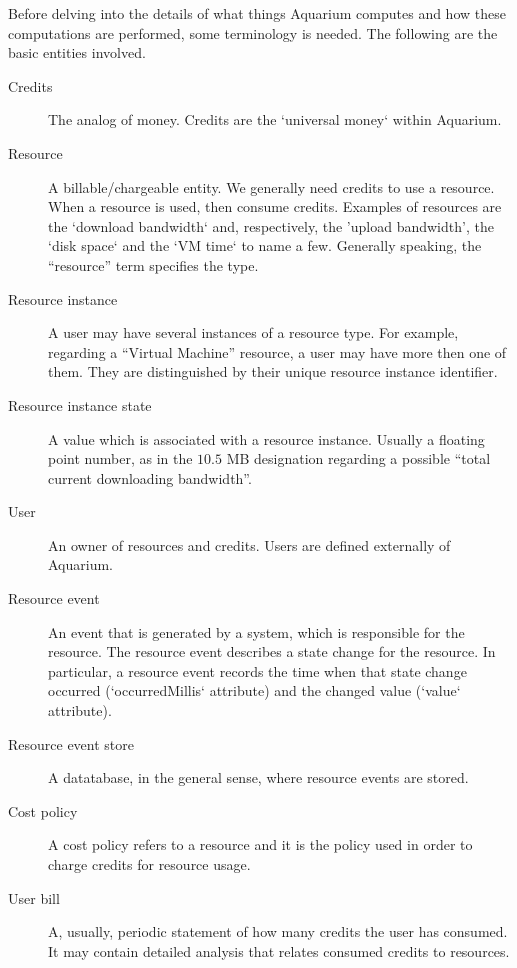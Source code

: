 \documentclass[preprint,10pt]{sigplanconf}
\begin{document}
Before delving into the details of what things Aquarium computes and how these computations are performed, some terminology is needed. The following are the basic entities  involved.

\begin{description}
\item[Credits]
The analog of money. Credits are the `universal money` within Aquarium.

\item[Resource]
A billable/chargeable entity. We generally need credits to use a resource. When a resource is used,  then consume credits. Examples of resources are the `download bandwidth` and, respectively,  the 'upload bandwidth', the `disk space` and the `VM time` to name a few. Generally speaking, the ``resource'' term specifies the type.

\item[Resource instance]
A user may have several instances of a resource type. For example, regarding a ``Virtual Machine'' resource, a user may have more then one of them. They are distinguished by their unique resource instance identifier.

\item[Resource instance state]
A value which is associated with a resource instance. Usually a floating point number, as in the $10.5$ MB designation regarding a possible ``total current downloading bandwidth''.

\item[User]
An owner of resources and credits. Users are defined externally of Aquarium.

\item[Resource event]
An event that is generated by a system, which is responsible for the resource.
The resource event describes a state change for the resource. In particular, a resource event records the time when that state change occurred (`occurredMillis` attribute) and the changed value (`value` attribute).

\item[Resource event store]
A datatabase, in the general sense, where resource events are stored.

\item[Cost policy]
A cost policy refers to a resource and it is the policy used in order to charge credits for resource usage.
  
\item[User bill]
A, usually, periodic statement of how many credits the user has consumed. It may contain detailed analysis that relates consumed credits to resources.
  

\end{description}
\end{document}
